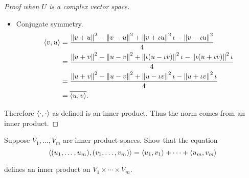 \begin{proof}[Proof when $U$ is a complex vector space]
\begin{itemize}
              Similar to the case of real vector space, if $\lambda$ is a real number, then $\innerprod{\lambda u, v} = \lambda\innerprod{u, v}$.
              \begin{align*}
                  \innerprod{\iota u, v} & = \frac{\norm{\iota u + v}^{2} - \norm{\iota u - v}^{2} + \norm{\iota u + \iota v}^{2}\iota - \norm{\iota u - \iota v}^{2}\iota}{4} \\
                                         & = \iota\frac{\norm{u + v}^{2} - \norm{u - v}^{2} + \norm{\iota(u + \iota v)}^{2}\iota - \norm{\iota(u - \iota v)}^{2}\iota}{4}      \\
                                         & = \iota\frac{\norm{u + v}^{2} - \norm{u - v}^{2} + \norm{u + \iota v}^{2}\iota - \norm{u - \iota v}^{2}\iota}{4}                    \\
                                         & = \iota\innerprod{u, v}.
              \end{align*}

              Hence if $\lambda = a + b\iota$ where $a, b\in\mathbb{R}$, we have
              \[
                  \innerprod{\lambda u, v} = a\innerprod{u, v} + b\iota\innerprod{u, v} = \lambda\innerprod{u, v}.
              \]
        \item Conjugate symmetry.
              \begin{align*}
                  \left\langle{v, u}\right\rangle & = \frac{\left\Vert{v + u}\right\Vert^{2} - \left\Vert{v - u}\right\Vert^{2} + \left\Vert{v + \iota u}\right\Vert^{2}\iota - \left\Vert{v - \iota u}\right\Vert^{2}}{4}                     \\
                                   & = \frac{\left\Vert{u + v}\right\Vert^{2} - \left\Vert{u - v}\right\Vert^{2} + \left\Vert{\iota (u - \iota v)}\right\Vert^{2}\iota - \left\Vert{\iota(u + \iota v)}\right\Vert^{2}\iota}{4} \\
                                   & = \frac{\left\Vert{u + v}\right\Vert^{2} - \left\Vert{u - v}\right\Vert^{2} + \left\Vert{ u - \iota v}\right\Vert^{2}\iota - \left\Vert{u + \iota v}\right\Vert^{2}\iota}{4}               \\
                                   & = \overline{\left\langle{u, v}\right\rangle}.
              \end{align*}
    \end{itemize}

    Therefore $\left\langle{\cdot, \cdot}\right\rangle$ as defined is an inner product. Thus the norm comes from an inner product.
\end{proof}
\newpage

\begin{exercise}
    Suppose $V_{1}, \ldots, V_{m}$ are inner product spaces. Show that the equation
    \[
        \left\langle{(u_{1}, \ldots, u_{m}), (v_{1}, \ldots, v_{m})}\right\rangle = \left\langle{u_{1}, v_{1}}\right\rangle + \cdots + \left\langle{u_{m}, v_{m}}\right\rangle
    \]

    defines an inner product on $V_{1}\times \cdots \times V_{m}$.
\end{exercise}

